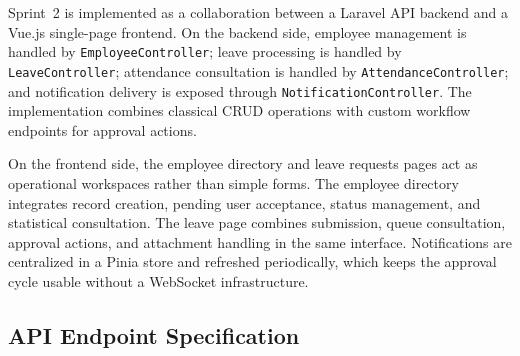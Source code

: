 Sprint~2 is implemented as a collaboration between a Laravel API backend and a Vue.js single-page
frontend. On the backend side, employee management is handled by
\texttt{EmployeeController}; leave processing is handled by \texttt{LeaveController}; attendance
consultation is handled by \texttt{AttendanceController}; and notification delivery is exposed
through \texttt{NotificationController}. The implementation combines classical CRUD operations
with custom workflow endpoints for approval actions.

On the frontend side, the employee directory and leave requests pages act as operational
workspaces rather than simple forms. The employee directory integrates record creation, pending
user acceptance, status management, and statistical consultation. The leave page combines
submission, queue consultation, approval actions, and attachment handling in the same interface.
Notifications are centralized in a Pinia store and refreshed periodically, which keeps the
approval cycle usable without a WebSocket infrastructure.

\subsection{API Endpoint Specification}

